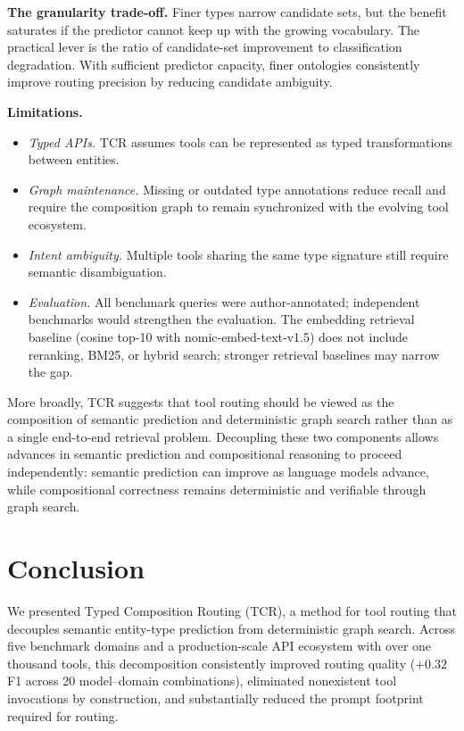 \documentclass{article}
\begin{document}
\textbf{The granularity trade-off.} Finer types narrow candidate sets, but the benefit saturates if the predictor cannot keep up with the growing vocabulary. The practical lever is the ratio of candidate-set improvement to classification degradation. With sufficient predictor capacity, finer ontologies consistently improve routing precision by reducing candidate ambiguity.

\textbf{Limitations.}
\begin{itemize}[leftmargin=*,nosep]
  \item \emph{Typed APIs.} TCR assumes tools can be represented as typed transformations between entities.
  \item \emph{Graph maintenance.} Missing or outdated type annotations reduce recall and require the composition graph to remain synchronized with the evolving tool ecosystem.
  \item \emph{Intent ambiguity.} Multiple tools sharing the same type signature still require semantic disambiguation.
  \item \emph{Evaluation.} All benchmark queries were author-annotated; independent benchmarks would strengthen the evaluation. The embedding retrieval baseline (cosine top-10 with nomic-embed-text-v1.5) does not include reranking, BM25, or hybrid search; stronger retrieval baselines may narrow the gap.
\end{itemize}

More broadly, TCR suggests that tool routing should be viewed as the composition of semantic prediction and deterministic graph search rather than as a single end-to-end retrieval problem. Decoupling these two components allows advances in semantic prediction and compositional reasoning to proceed independently: semantic prediction can improve as language models advance, while compositional correctness remains deterministic and verifiable through graph search.


\section{Conclusion}

We presented Typed Composition Routing (TCR), a method for tool routing that decouples semantic entity-type prediction from deterministic graph search. Across five benchmark domains and a production-scale API ecosystem with over one thousand tools, this decomposition consistently improved routing quality ($+0.32$ F1 across 20 model--domain combinations), eliminated nonexistent tool invocations by construction, and substantially reduced the prompt footprint required for routing.
\end{document}
